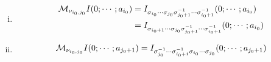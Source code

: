 \begin{theorem}
\begin{enumerate}[i.]
\item 
\begin{equation}\label{eq: M_{i0,j0}I(0;...;a_{i0})}
\begin{aligned}
\mathcal M_{\nu_{i_0,j_0}}I(0;\cdots;a_{i_0})&=I_{\sigma_{i_0}\cdots\sigma_{j_0}\sigma_{j_0+1}^{-1}\cdots\sigma_{i_0+1}^{-1}}(0;\cdots;a_{i_0})\\
&=I_{\sigma_{i_0+1}\cdots\sigma_{j_0}\sigma_{j_0+1}^{-1}\cdots\sigma_{i_0+1}^{-1}}(0;\cdots;a_{i_0})\\
\end{aligned}
\end{equation}
\item 
\begin{equation}\label{eq: M_{i0,j0}I(0;...;a_{j0+1})}
\begin{aligned}
\mathcal M_{\nu_{i_0,j_0}}I(0;\cdots;a_{j_0+1})&=I_{\sigma_{j_0}^{-1}\cdots\sigma_{i_0+1}^{-1}\sigma_{i_0}\cdots\sigma_{j_0}}(0;\cdots;a_{j_0+1})\\
\end{aligned}
\end{equation}
\end{enumerate}
\end{theorem}

